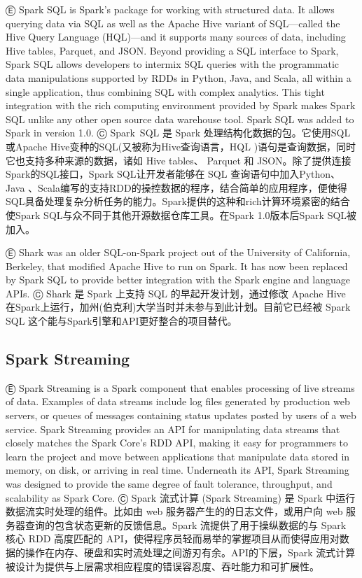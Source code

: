 Ⓔ Spark SQL is Spark's package for working with structured data. It
allows querying data via SQL as well as the Apache Hive variant of
SQL---called the Hive Query Language (HQL)---and it supports many
sources of data, including Hive tables, Parquet, and JSON. Beyond
providing a SQL interface to Spark, Spark SQL allows developers to
intermix SQL queries with the programmatic data manipulations supported
by RDDs in Python, Java, and Scala, all within a single application,
thus combining SQL with complex analytics. This tight integration with
the rich computing environment provided by Spark makes Spark SQL unlike
any other open source data warehouse tool. Spark SQL was added to Spark
in version 1.0. Ⓒ Spark~SQL 是 Spark
处理结构化数据的包。它使用SQL或Apache
Hive变种的SQL(又被称为Hive查询语言，HQL
)语句是查询数据，同时它也支持多种来源的数据，诸如 Hive tables、 Parquet
和 JSON。除了提供连接Spark的SQL接口，Spark SQL让开发者能够在 SQL
查询语句中加入Python、Java
、Scala编写的支持RDD的操控数据的程序，结合简单的应用程序，便使得SQL具备处理复杂分析任务的能力。Spark提供的这种和rich计算环境紧密的结合使Spark
SQL与众不同于其他开源数据仓库工具。在Spark 1.0版本后Spark SQL被加入。

Ⓔ Shark was an older SQL-on-Spark project out of the University of
California, Berkeley, that modified Apache Hive to run on Spark. It has
now been replaced by Spark SQL to provide better integration with the
Spark engine and language APIs. Ⓒ Shark 是 Spark 上支持 SQL
的早起开发计划，通过修改 Apache Hive
在Spark上运行，加州(伯克利)大学当时并未参与到此计划。目前它已经被 Spark
SQL 这个能与Spark引擎和API更好整合的项目替代。

\subsection{Spark Streaming}\label{spark-streaming}

Ⓔ Spark Streaming is a Spark component that enables processing of live
streams of data. Examples of data streams include log files generated by
production web servers, or queues of messages containing status updates
posted by users of a web service. Spark Streaming provides an API for
manipulating data streams that closely matches the Spark Core's RDD API,
making it easy for programmers to learn the project and move between
applications that manipulate data stored in memory, on disk, or arriving
in real time. Underneath its API, Spark Streaming was designed to
provide the same degree of fault tolerance, throughput, and scalability
as Spark Core. Ⓒ Spark 流式计算 (Spark Streaming) 是 Spark
中运行数据流实时处理的组件。比如由 web 服务器产生的的日志文件，或用户向
web 服务器查询的包含状态更新的反馈信息。Spark 流提供了用于操纵数据的与
Spark 核心 RDD 高度匹配的
API，使得程序员轻而易举的掌握项目从而使得应用对数据的操作在内存、硬盘和实时流处理之间游刃有余。API的下层，Spark
流式计算被设计为提供与上层需求相应程度的错误容忍度、吞吐能力和可扩展性。

